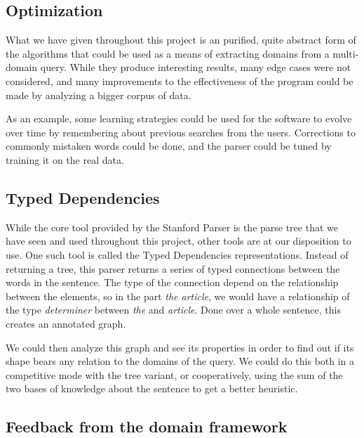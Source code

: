 \subsection{Optimization} %
\label{sub:optimization}

What we have given throughout this project is an purified, quite abstract form of the algorithms that could be used as a means of extracting domains from a multi-domain query. While they produce interesting results, many edge cases were not considered, and many improvements to the effectiveness of the program could be made by analyzing a bigger corpus of data.

As an example, some learning strategies could be used for the software to evolve over time by remembering about previous searches from the users. Corrections to commonly mistaken words could be done, and the parser could be tuned by training it on the real data.


\subsection{Typed Dependencies} %
\label{sub:typed_dependencies}

While the core tool provided by the Stanford Parser is the parse tree that we have seen and used throughout this project, other tools are at our disposition to use. One such tool is called the Typed Dependencies representations. Instead of returning a tree, this parser returns a series of typed connections between the words in the sentence. The type of the connection depend on the relationship between the elements, so in the part \emph{the article}, we would have a relationship of the type \emph{determiner} between \emph{the} and \emph{article}. Done over a whole sentence, this creates an annotated graph.

We could then analyze this graph and see its properties in order to find out if its shape bears any relation to the domains of the query. We could do this both in a competitive mode with the tree variant, or cooperatively, using the sum of the two bases of knowledge about the sentence to get a better heuristic.


\subsection{Feedback from the domain framework} %
\label{sub:feedback_from_the_domain_framework}


